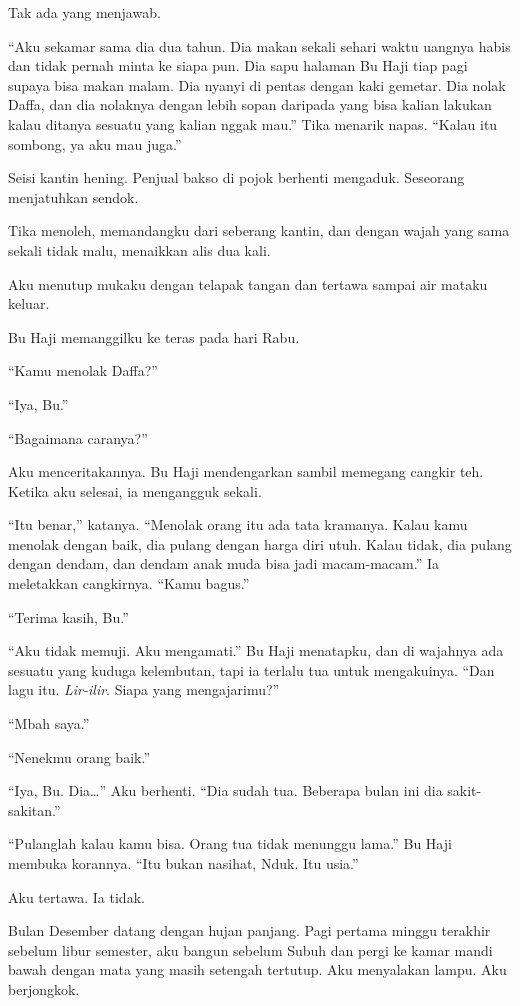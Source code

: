 \documentclass[11pt,twoside,openany]{book}
\makeatletter
\newcommand{\scenebreak}{\par\vspace{0.9em}{\centering\textsc{*\hspace{0.7em}*\hspace{0.7em}*}\par}\vspace{0.9em}\@afterindentfalse\@afterheading}
\makeatother
\begin{document}
Tak ada yang menjawab.

``Aku sekamar sama dia dua tahun. Dia makan sekali sehari waktu uangnya habis dan tidak pernah minta ke siapa pun. Dia sapu halaman Bu Haji tiap pagi supaya bisa makan malam. Dia nyanyi di pentas dengan kaki gemetar. Dia nolak Daffa, dan dia nolaknya dengan lebih sopan daripada yang bisa kalian lakukan kalau ditanya sesuatu yang kalian nggak mau.'' Tika menarik napas. ``Kalau itu sombong, ya aku mau juga.''

Seisi kantin hening. Penjual bakso di pojok berhenti mengaduk. Seseorang menjatuhkan sendok.

Tika menoleh, memandangku dari seberang kantin, dan dengan wajah yang sama sekali tidak malu, menaikkan alis dua kali.

Aku menutup mukaku dengan telapak tangan dan tertawa sampai air mataku keluar.

\scenebreak
Bu Haji memanggilku ke teras pada hari Rabu.

``Kamu menolak Daffa?''

``Iya, Bu.''

``Bagaimana caranya?''

Aku menceritakannya. Bu Haji mendengarkan sambil memegang cangkir teh. Ketika aku selesai, ia mengangguk sekali.

``Itu benar,'' katanya. ``Menolak orang itu ada tata kramanya. Kalau kamu menolak dengan baik, dia pulang dengan harga diri utuh. Kalau tidak, dia pulang dengan dendam, dan dendam anak muda bisa jadi macam-macam.'' Ia meletakkan cangkirnya. ``Kamu bagus.''

``Terima kasih, Bu.''

``Aku tidak memuji. Aku mengamati.'' Bu Haji menatapku, dan di wajahnya ada sesuatu yang kuduga kelembutan, tapi ia terlalu tua untuk mengakuinya. ``Dan lagu itu. \emph{Lir-ilir}. Siapa yang mengajarimu?''

``Mbah saya.''

``Nenekmu orang baik.''

``Iya, Bu. Dia\ldots{}'' Aku berhenti. ``Dia sudah tua. Beberapa bulan ini dia sakit-sakitan.''

``Pulanglah kalau kamu bisa. Orang tua tidak menunggu lama.'' Bu Haji membuka korannya. ``Itu bukan nasihat, Nduk. Itu usia.''

Aku tertawa. Ia tidak.

\scenebreak
Bulan Desember datang dengan hujan panjang. Pagi pertama minggu terakhir sebelum libur semester, aku bangun sebelum Subuh dan pergi ke kamar mandi bawah dengan mata yang masih setengah tertutup. Aku menyalakan lampu. Aku berjongkok.
\end{document}

